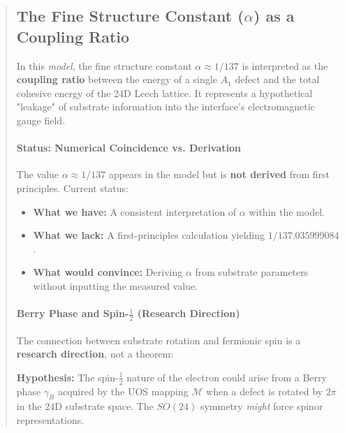 \documentclass[11pt,titlepage]{article}
\begin{document}
\begin{abstract}
\subsection{The Fine Structure Constant ($\alpha$) as a Coupling Ratio}
\begin{tcolorbox}[colback=yellow!5!white,colframe=yellow!75!black,title=Conjecture (Fine Structure Constant from Substrate Leakage)]
\label{conj:alpha-leakage}
In this \emph{model}, the fine structure constant $\alpha \approx 1/137$ is interpreted as the \textbf{coupling ratio} between the energy of a single $A_1$ defect and the total cohesive energy of the 24D Leech lattice. It represents a hypothetical "leakage" of substrate information into the interface's electromagnetic gauge field.
\end{tcolorbox}

\paragraph{Status: Numerical Coincidence vs. Derivation}
The value $\alpha \approx 1/137$ appears in the model but is \textbf{not derived} from first principles. Current status:
\begin{itemize}
\item \textbf{What we have:} A consistent interpretation of $\alpha$ within the model.
\item \textbf{What we lack:} A first-principles calculation yielding $1/137.035999084$.
\item \textbf{What would convince:} Deriving $\alpha$ from substrate parameters without inputting the measured value.
\end{itemize}

\paragraph{Berry Phase and Spin-$\frac{1}{2}$ (Research Direction)}
The connection between substrate rotation and fermionic spin is a \textbf{research direction}, not a theorem:

\begin{tcolorbox}[colback=blue!5!white,colframe=blue!75!black,title=Research Direction: Spin from Substrate Geometry]
\label{rd:spin-berry}
\textbf{Hypothesis:} The spin-$\frac{1}{2}$ nature of the electron could arise from a Berry phase $\gamma_B$ acquired by the UOS mapping $\mathcal{M}$ when a defect is rotated by $2\pi$ in the 24D substrate space. The $SO(24)$ symmetry \emph{might} force spinor representations.
\end{tcolorbox}


\end{abstract}
\end{document}
